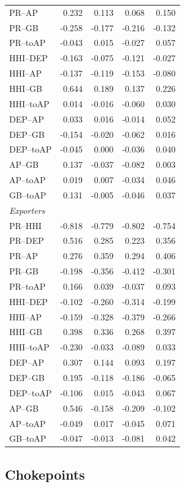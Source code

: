 \documentclass[pdftex,12pt,openright,a4paper,oneside]{book}
\begin{document}
\begin{longtable}{lrrrr}
PR--AP & 0.232 & 0.113 & 0.068 & 0.150 \\
PR--GB & -0.258 & -0.177 & -0.216 & -0.132 \\
PR--toAP & -0.043 & 0.015 & -0.027 & 0.057 \\
HHI--DEP & -0.163 & -0.075 & -0.121 & -0.027 \\
HHI--AP & -0.137 & -0.119 & -0.153 & -0.080 \\
HHI--GB & 0.644 & 0.189 & 0.137 & 0.226 \\
HHI--toAP & 0.014 & -0.016 & -0.060 & 0.030 \\
DEP--AP & 0.033 & 0.016 & -0.014 & 0.052 \\
DEP--GB & -0.154 & -0.020 & -0.062 & 0.016 \\
DEP--toAP & -0.045 & 0.000 & -0.036 & 0.040 \\
AP--GB & 0.137 & -0.037 & -0.082 & 0.003 \\
AP--toAP & 0.019 & 0.007 & -0.034 & 0.046 \\
GB--toAP & 0.131 & -0.005 & -0.046 & 0.037 \\
\midrule
\multicolumn{5}{l}{\textit{Exporters}}\\
\midrule
PR--HHI & -0.818 & -0.779 & -0.802 & -0.754 \\
PR--DEP & 0.516 & 0.285 & 0.223 & 0.356 \\
PR--AP & 0.276 & 0.359 & 0.294 & 0.406 \\
PR--GB & -0.198 & -0.356 & -0.412 & -0.301 \\
PR--toAP & 0.166 & 0.039 & -0.037 & 0.093 \\
HHI--DEP & -0.102 & -0.260 & -0.314 & -0.199 \\
HHI--AP & -0.159 & -0.328 & -0.379 & -0.266 \\
HHI--GB & 0.398 & 0.336 & 0.268 & 0.397 \\
HHI--toAP & -0.230 & -0.033 & -0.089 & 0.033 \\
DEP--AP & 0.307 & 0.144 & 0.093 & 0.197 \\
DEP--GB & 0.195 & -0.118 & -0.186 & -0.065 \\
DEP--toAP & -0.106 & 0.015 & -0.043 & 0.067 \\
AP--GB & 0.546 & -0.158 & -0.209 & -0.102 \\
AP--toAP & -0.049 & 0.017 & -0.045 & 0.071 \\
GB--toAP & -0.047 & -0.013 & -0.081 & 0.042 \\
\end{longtable}


\subsection{Chokepoints}
\end{document}

